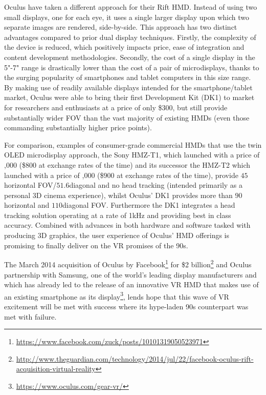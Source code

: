 Oculus have taken a different approach for their Rift HMD. Instead of using two small displays, one for each eye, it uses a single larger display upon which two separate images are rendered, side-by-side. This approach has two distinct advantages compared to prior dual display techniques. Firstly, the complexity of the device is reduced, which positively impacts price, ease of integration and content development methodologies. Secondly, the cost of a single display in the 5"-7" range is drastically lower than the cost of a pair of microdisplays, thanks to the surging popularity of smartphones and tablet computers in this size range. By making use of readily available displays intended for the smartphone/tablet market, Oculus were able to bring their first Development Kit (DK1) to market for researchers and enthusiasts at a price of only \$300, but still provide substantially wider FOV than the vast majority of existing HMDs (even those commanding substantially higher price points).

For comparison, examples of consumer-grade commercial HMDs that use the twin OLED microdisplay approach, the Sony HMZ-T1, which launched with a price of ,000 (\$800 at exchange rates of the time) and its successor the HMZ-T2 which launched with a price of ,000 (\$900 at exchange rates of the time), provide $45$\textdegree horizontal FOV/$51.6$\textdegree diagonal and no head tracking (intended primarily as a personal 3D cinema experience), whilst Oculus' DK1 provides more than $90$\textdegree horizontal and $110$\textdegree diagonal FOV. Furthermore the DK1 integrates a head tracking solution operating at a rate of 1kHz and providing best in class accuracy. Combined with advances in both hardware and software tasked with producing 3D graphics, the user experience of Oculus' HMD offerings is promising to finally deliver on the VR promises of the 90s.

The March 2014 acquisition of Oculus by Facebook\footnote{\url{https://www.facebook.com/zuck/posts/10101319050523971}} for \$2 billion\footnote{\url{http://www.theguardian.com/technology/2014/jul/22/facebook-oculus-rift-acquisition-virtual-reality}} and Oculus partnership with Samsung, one of the world's leading display manufacturers and which has already led to the release of an innovative VR HMD that makes use of an existing smartphone as its display\footnote{\url{https://www.oculus.com/gear-vr/}}, lends hope that this wave of VR excitement will be met with success where its hype-laden 90s counterpart was met with failure.

